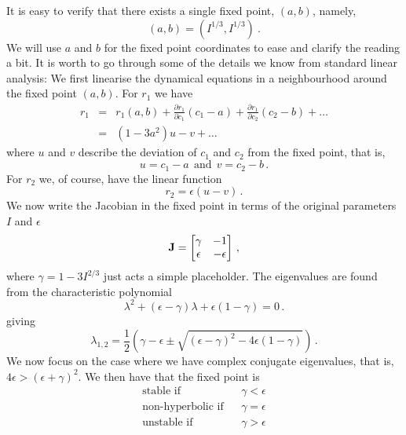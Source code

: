 It is easy to verify that there exists a single fixed point, $(a, b)$, namely, 
\begin{equation}
	(a, b) = (I^{1/3}, I^{1/3}) \ .
\end{equation}
We will use $a$ and $b$ for the fixed point coordinates to ease and clarify 
the reading a bit. It is worth to go through some of the details we know from standard 
linear analysis: We first linearise the dynamical equations in a neighbourhood 
around the fixed point $(a,b)$. For $r_1$ we have
\begin{eqnarray}
	r_1 &=& r_1(a,b) + \frac{\partial r_1}{\partial c_1}(c_1-a) + \frac{\partial r_1}{\partial c_2}(c_2-b) + \ldots \\
				 &=&	(1-3a^2) u - v + \dots
\end{eqnarray}
where $u$ and $v$ describe the deviation of $c_1$ and $c_2$ from the fixed point, that is, 
\begin{equation}
	u = c_1 - a \ \ \text{and} \ \ v = c_2 - b \, .
\end{equation}
For $r_2$ we, of course, have the linear function 
\begin{equation}
	r_2 = \epsilon (u - v) \, .
\end{equation}
We now write the Jacobian in the fixed point in terms of the original parameters $I$ and
$\epsilon$  
\begin{equation}
\mathbf{J} = 
	\begin{bmatrix}
    \gamma & -1 \\
    \epsilon & -\epsilon
 \end{bmatrix} \, ,
\end{equation}
where $\gamma =  1-3I^{2/3}$ just acts a simple placeholder. 
The eigenvalues are found from the characteristic polynomial
\begin{equation}
	\lambda^2 + (\epsilon - \gamma) \lambda + \epsilon(1-\gamma) = 0 \, .
\end{equation}
 giving
\begin{equation}
	\lambda_{1,2} = \frac{1}{2}\left(
	\gamma -\epsilon \pm \sqrt{(\epsilon - \gamma)^2 - 4\epsilon(1-\gamma) }
	\right) \, .
\end{equation}
We now focus on the case where we have complex conjugate eigenvalues, that is, $4\epsilon >
(\epsilon + \gamma)^2$. We then have that the fixed point is 
\begin{eqnarray}
	\text{stable if} &&\gamma < \epsilon \nonumber \\
	\text{non-hyperbolic if} && \gamma = \epsilon \nonumber \\
	\text{unstable if} && \gamma > \epsilon \nonumber
\end{eqnarray}
